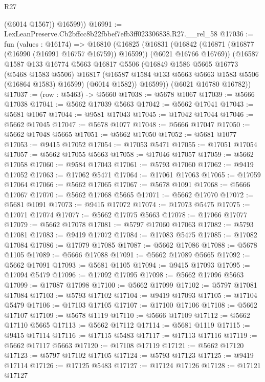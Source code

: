 \begin{lexlean}{R27}
\begin{coremodule}
          (@6014 @1567))
        @16599))
@16991 := LexLeanPreserve.Cb2bffcc8b22fbbef7efb3ff023306838.R27.__rel_58
@17036 := fun (values : @16174) =>
  @16810
    (@16825
      (@16831
        (@16842 (@16871 (@16877 (@16990 (@16991 @16757 @16759)) @16599)) (@6021 @16766 @16769))
        (@16587
          @1587
          @133
          @16774
          @5663
          @16817
          @5506
          (@16849
            @1586
            @5665
            @16773
            (@5468 @1583 @5506)
            @16817
            (@16587 @1584 @133 @5663 @5663 @1583 @5506 (@16864 @1583) @16599)
            (@6014 @1582))
          @16599))
      (@6021 @16780 @16782))
@17037 := (row : @5463) -> @5660
@17038 := @5678 @1067
@17039 := @5666 @17038
@17041 := @5662 @17039 @5663
@17042 := @5662 @17041
@17043 := @5681 @1067
@17044 := @9581 @17043
@17045 := @17042 @17044
@17046 := @5662 @17045
@17047 := @5678 @1077
@17048 := @5666 @17047
@17050 := @5662 @17048 @5665
@17051 := @5662 @17050
@17052 := @5681 @1077
@17053 := @9415 @17052
@17054 := @17053 @5471
@17055 := @17051 @17054
@17057 := @5662 @17055 @5663
@17058 := @17046 @17057
@17059 := @5662 @17058
@17060 := @9584 @17043
@17061 := @5793 @17060
@17062 := @9419 @17052
@17063 := @17062 @5471
@17064 := @17061 @17063
@17065 := @17059 @17064
@17066 := @5662 @17065
@17067 := @5678 @1091
@17068 := @5666 @17067
@17070 := @5662 @17068 @5665
@17071 := @5662 @17070
@17072 := @5681 @1091
@17073 := @9415 @17072
@17074 := @17073 @5475
@17075 := @17071 @17074
@17077 := @5662 @17075 @5663
@17078 := @17066 @17077
@17079 := @5662 @17078
@17081 := @5797 @17060 @17063
@17082 := @5793 @17081
@17083 := @9419 @17072
@17084 := @17083 @5475
@17085 := @17082 @17084
@17086 := @17079 @17085
@17087 := @5662 @17086
@17088 := @5678 @1105
@17089 := @5666 @17088
@17091 := @5662 @17089 @5665
@17092 := @5662 @17091
@17093 := @5681 @1105
@17094 := @9415 @17093
@17095 := @17094 @5479
@17096 := @17092 @17095
@17098 := @5662 @17096 @5663
@17099 := @17087 @17098
@17100 := @5662 @17099
@17102 := @5797 @17081 @17084
@17103 := @5793 @17102
@17104 := @9419 @17093
@17105 := @17104 @5479
@17106 := @17103 @17105
@17107 := @17100 @17106
@17108 := @5662 @17107
@17109 := @5678 @1119
@17110 := @5666 @17109
@17112 := @5662 @17110 @5665
@17113 := @5662 @17112
@17114 := @5681 @1119
@17115 := @9415 @17114
@17116 := @17115 @5483
@17117 := @17113 @17116
@17119 := @5662 @17117 @5663
@17120 := @17108 @17119
@17121 := @5662 @17120
@17123 := @5797 @17102 @17105
@17124 := @5793 @17123
@17125 := @9419 @17114
@17126 := @17125 @5483
@17127 := @17124 @17126
@17128 := @17121 @17127

\end{coremodule}
\end{lexlean}
